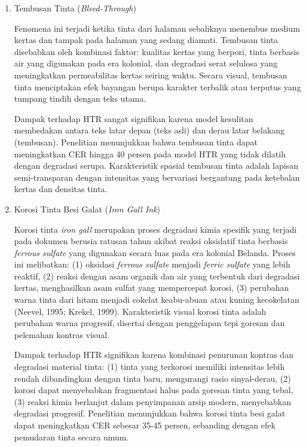 \begin{enumerate}[leftmargin=*, labelindent=0pt, itemsep=1ex, topsep=0pt]

\item Tembusan Tinta (\textit{Bleed-Through})
\label{para:bleed-through}

Fenomena ini terjadi ketika tinta dari halaman sebaliknya menembus medium kertas dan tampak pada halaman yang sedang diamati. Tembusan tinta disebabkan oleh kombinasi faktor: kualitas kertas yang berpori, tinta berbasis air yang digunakan pada era kolonial, dan degradasi serat selulosa yang meningkatkan permeabilitas kertas seiring waktu. Secara visual, tembusan tinta menciptakan efek bayangan berupa karakter terbalik atau terputus yang tumpang tindih dengan teks utama.

Dampak terhadap HTR sangat signifikan karena model kesulitan membedakan antara teks latar depan (teks asli) dan derau latar belakang (tembusan). Penelitian \parencite{gatos2006} menunjukkan bahwa tembusan tinta dapat meningkatkan CER hingga 40 persen pada model HTR yang tidak dilatih dengan degradasi serupa. Karakteristik spasial tembusan tinta adalah lapisan semi-transparan dengan intensitas yang bervariasi bergantung pada ketebalan kertas dan densitas tinta.

\item Korosi Tinta Besi Galat (\textit{Iron Gall Ink})
\label{para:korosi-tinta}

Korosi tinta \textit{iron gall} merupakan proses degradasi kimia spesifik yang terjadi pada dokumen berusia ratusan tahun akibat reaksi oksidatif tinta berbasis \textit{ferrous sulfate} yang digunakan secara luas pada era kolonial Belanda. Proses ini melibatkan: (1) oksidasi \textit{ferrous sulfate} menjadi \textit{ferric sulfate} yang lebih reaktif, (2) reaksi dengan asam organik dan air yang terbentuk dari degradasi kertas, menghasilkan asam sulfat yang mempercepat korosi, (3) perubahan warna tinta dari hitam menjadi cokelat keabu-abuan atau kuning kecokelatan (Neevel, 1995; Krekel, 1999). Karakteristik visual korosi tinta adalah perubahan warna progresif, disertai dengan penggelapan tepi goresan dan pelemahan kontras visual.

Dampak terhadap HTR signifikan karena kombinasi penurunan kontras dan degradasi material tinta: (1) tinta yang terkorosi memiliki intensitas lebih rendah dibandingkan dengan tinta baru, mengurangi rasio sinyal-derau, (2) korosi dapat menyebabkan fragmentasi halus pada goresan tinta yang tebal, (3) reaksi kimia berlanjut dalam penyimpanan arsip modern, menyebabkan degradasi progresif. Penelitian menunjukkan bahwa korosi tinta besi galat dapat meningkatkan CER sebesar 35-45 persen, sebanding dengan efek pemudaran tinta secara umum.


\end{enumerate}
